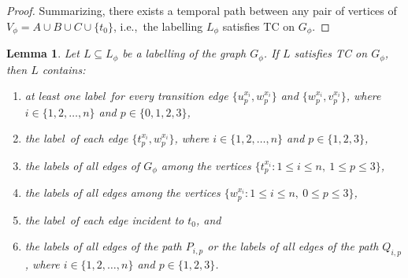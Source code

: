\documentclass[a4paper,UKenglish]{article}
\newtheorem{lemma}{Lemma}
\begin{document}
\begin{proof}
Summarizing, there exists a temporal path between any pair of vertices of $V_{\phi }=A\cup B\cup C\cup \{t_{0}\}$, i.e.,~the labelling $L
_{\phi }$ satisfies TC on $G_{\phi }$.
\end{proof}



\begin{lemma}
\label{lambda-necessary-labels-lem}
Let $L \subseteq L _{\phi }$
be a labelling of the graph $G_{\phi }$. If $L$ satisfies TC on $G_{\phi }$, then $L $ contains:
\begin{enumerate}[label=(\alph*)]
\item at least one label~for every transition edge $\{ u_{p}^{x_{i}} , w_{p}^{x_{i}}  \} $ and $ \{ w_{p}^{x_{i}} , v_{p}^{x_{i}} \}$, where $i\in
\{1,2,\ldots ,n\}$ and $p\in \{0,1,2,3\}$,

\item the label~of each edge $ \{ t_{p}^{x_{i}} , w_{p}^{x_{i}} \} $, where $i\in
\{1,2,\ldots ,n\}$ and $p\in \{1,2,3\}$,

\item the labels of all edges of $G_{\phi }$ among the vertices $\{t_{p}^{x_{i}}:1\leq i\leq n,\ 1\leq p\leq 3\}$,

\item the labels of all edges among the vertices $\{w_{p}^{x_{i}}:1\leq
i\leq n,\ 0\leq p\leq 3\}$,

\item the label~of each edge incident to $t_{0}$, and

\item the labels of all edges of the path $P_{i,p}$ or the labels of
all edges of the path $Q_{i,p}$, where $i\in \{1,2,\ldots ,n\}$ and $p\in
\{1,2,3\}$.
\end{enumerate}
\end{lemma}
\end{document}
